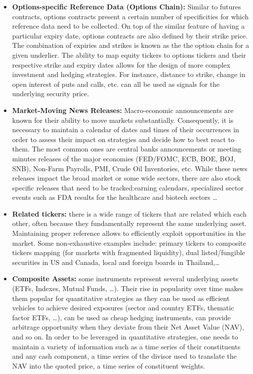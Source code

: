 \begin{itemize}
\item \textbf{Options-specific Reference Data (Options Chain):} Similar to futures contracts, options contracts present a certain number of specificities for which reference data need to be collected. On top of the similar feature of having a particular expiry date, options contracts are also defined by their strike price. The combination of expiries and strikes is known as the the option chain for a given underlier. The ability to map equity tickers to options tickers and their respective strike and expiry dates allows for the design of more complex investment and hedging strategies. For instance, distance to strike, change in open interest of puts and calls, etc. can all be used as signals for the underlying security price.


\item \textbf{Market-Moving News Releases:} Macro-economic announcements are known for their ability to move markets substantially. Consequently, it is necessary to maintain a calendar of dates and times of their occurrences in order to assess their impact on strategies and decide how to best react to them. The most common ones are central banks announcements or meeting minutes releases of the major economies (FED/FOMC, ECB, BOE, BOJ, SNB), Non-Farm Payrolls, PMI, Crude Oil Inventories, etc. While these news releases impact the broad market or some wide sectors, there are also stock specific releases that need to be tracked:earning calendars, specialized sector events such as FDA results for the healthcare and biotech sectors  \dots 


\item \textbf{Related tickers:} there is a wide range of tickers that are related which each other, often because they fundamentally represent the same underlying asset. Maintaining proper reference allows to efficiently exploit opportunities in the market. Some non-exhaustive examples include: primary tickers to composite tickers mapping (for markets with fragmented liquidity), dual listed/fungible securities in US and Canada, local and foreign boards in Thailand,\dots 


\item \textbf{Composite Assets:} some instruments represent several underlying assets (ETFs, Indexes, Mutual Funds, \dots). Their rise in popularity over time makes them popular for quantitative strategies as they can be used as efficient vehicles to achieve desired exposures (sector and country ETFs, thematic factor ETFs, \dots), can be used as cheap hedging instruments, can provide arbitrage opportunity when they deviate from their Net Asset Value (NAV), and so on. 
In order to be leveraged in quantitative strategies, one needs to maintain a variety of information such as a time series of their constituents and any cash component, a time series of the divisor used to translate the NAV into the quoted price, a time series of constituent weights. 



\end{itemize}
